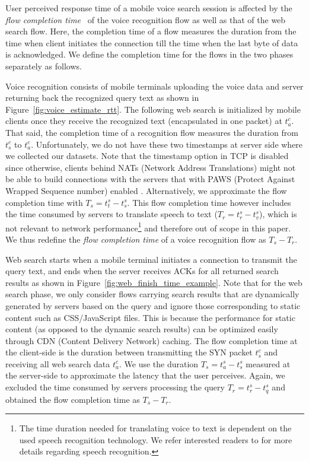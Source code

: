 User perceived response time of a mobile voice search session is affected by the \emph{flow completion time}~\cite{dukkipati2006flow} of the voice recognition flow as well as that of the web search flow. Here, the completion time of a flow measures the duration from the time when client initiates the connection till the time when the last byte of data is acknowledged. We define the completion time for the flows in the two phases separately as follows.

Voice recognition consists of mobile terminals uploading the voice data and server returning back the recognized query text as shown in Figure~\ref{fig:voice_estimate_rtt}. The following web search is initialized by mobile clients once they receive the recognized text (encapsulated in one packet) at $t^c_a$. That said, the completion time of a recognition flow measures the duration from $t^c_s$ to $t^c_a$. Unfortunately, we do not have these two timestamps at server side where we collected our datasets. Note that the timestamp option in TCP is disabled since otherwise, clients behind NATs (Network Address Translations) might not be able to build connections with the servers that with PAWS (Protect Against Wrapped Sequence number) \cite{rfc7323} enabled \cite{Wang:2011:USM:2018436.2018479}. Alternatively, we approximate the flow completion time with $T_s=t^s_t - t^s_s$. This flow completion time however includes the time consumed by servers to translate speech to text ($T_r=t^s_r - t^s_v$), which is not relevant to network performance\footnote{The time duration needed for translating voice to text is dependent on the used speech recognition technology. We refer interested readers to \cite{36463,schalkwyk2010your} for more details regarding speech recognition.} and therefore out of scope in this paper. We thus redefine the \emph{flow completion time} of a voice recognition flow as $T_s-T_r$.

Web search starts when a mobile terminal initiates a connection to transmit the query text, and ends when the server receives ACKs for all returned search results as shown in Figure~\ref{fig:web_finish_time_example}. Note that for the web search phase, we only consider flows carrying search results that are dynamically generated by servers based on the query and ignore those corresponding to static content such as CSS/JavaScript files. This is because the performance for static content (as opposed to the dynamic search results) can be optimized easily through CDN (Content Delivery Network) caching. The flow completion time at the client-side is the duration between transmitting the SYN packet $t^c_s$ and receiving all web search data $t^c_a$. We use the duration $T_s=t^s_a - t^s_s$ measured at the server-side to approximate the latency that the user perceives. Again, we excluded the time consumed by servers processing the query $T_r=t^s_r - t^s_q$ and obtained the flow completion time as $T_s-T_r$.

